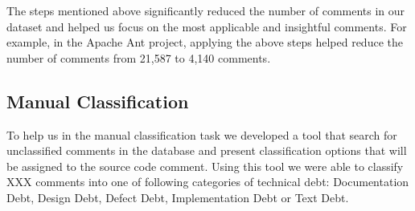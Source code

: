 The steps mentioned above significantly reduced the number of comments in our dataset and helped us focus on the most applicable and insightful comments. For example, in the Apache Ant project, applying the above steps helped reduce the number of comments from 21,587 to 4,140 comments.


\subsection{Manual Classification} %
\label{sub:manual_classification}
To help us in the manual classification task we developed a tool that search for unclassified comments in the database and present classification options that will be assigned to the source code comment. Using this tool we were able to classify XXX comments into one of following categories of technical debt: Documentation Debt, Design Debt, Defect Debt, Implementation Debt or Text  Debt.  





